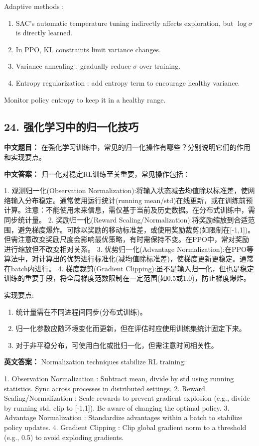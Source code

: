 \documentclass[10pt,a4paper]{ctexart}
\begin{document}
 Adaptive methods :
\begin{enumerate}
    \item SAC's automatic temperature tuning indirectly affects exploration, but \(\log\sigma\) is directly learned.
    \item In PPO, KL constraints limit variance changes.
    \item Variance annealing : gradually reduce \(\sigma\) over training.
    \item Entropy regularization : add entropy term to encourage healthy variance.
\end{enumerate}

Monitor policy entropy to keep it in a healthy range.

\subsection*{24. 强化学习中的归一化技巧}
\textbf{中文题目：} 在强化学习训练中，常见的归一化操作有哪些？分别说明它们的作用和实现要点。

\textbf{中文答案：}  
归一化对稳定RL训练至关重要，常见操作包括：

1.  观测归一化(Observation Normalization):将输入状态减去均值除以标准差，使网络输入分布稳定。通常使用运行统计(running mean/std)在线更新，或在训练前预计算。注意：不能使用未来信息，需仅基于当前及历史数据。在分布式训练中，需同步统计量。
2.  奖励归一化(Reward Scaling/Normalization):将奖励缩放到合适范围，避免梯度爆炸。可除以奖励的移动标准差，或使用奖励裁剪(如限制在[-1,1])。但需注意改变奖励尺度会影响最优策略，有时需保持不变。在PPO中，常对奖励进行缩放但不改变相对关系。
3.  优势归一化(Advantage Normalization):在PPO等算法中，对计算出的优势进行标准化(减均值除标准差)，使梯度更新更稳定。通常在batch内进行。
4.  梯度裁剪(Gradient Clipping):虽不是输入归一化，但也是稳定训练的重要手段，将全局梯度范数限制在一定范围(如0.5或1.0)，防止梯度爆炸。

 实现要点:
\begin{enumerate}
    \item 统计量需在不同进程间同步(分布式训练)。
    \item 归一化参数应随环境变化而更新，但在评估时应使用训练集统计固定下来。
    \item 对于非平稳分布，可使用白化或批归一化，但需注意时间相关性。
\end{enumerate}

\textbf{英文答案：}  
Normalization techniques stabilize RL training:

1.  Observation Normalization : Subtract mean, divide by std using running statistics. Sync across processes in distributed settings.
2.  Reward Scaling/Normalization : Scale rewards to prevent gradient explosion (e.g., divide by running std, clip to [-1,1]). Be aware of changing the optimal policy.
3.  Advantage Normalization : Standardize advantages within a batch to stabilize policy updates.
4.  Gradient Clipping : Clip global gradient norm to a threshold (e.g., 0.5) to avoid exploding gradients.
\end{document}
